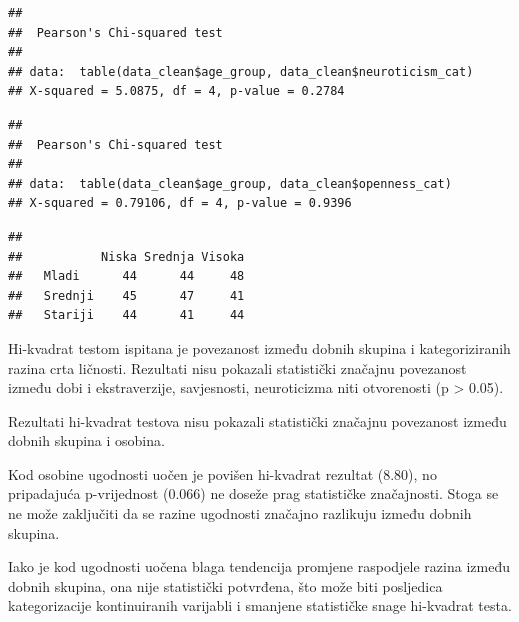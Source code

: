 \documentclass[
]{article}
\newenvironment{Shaded}{\begin{snugshade}}{\end{snugshade}}
\newcommand{\FunctionTok}[1]{\textcolor[rgb]{0.13,0.29,0.53}{\textbf{#1}}}
\newcommand{\NormalTok}[1]{#1}
\newcommand{\SpecialCharTok}[1]{\textcolor[rgb]{0.81,0.36,0.00}{\textbf{#1}}}
\begin{document}
\begin{verbatim}
## 
##  Pearson's Chi-squared test
## 
## data:  table(data_clean$age_group, data_clean$neuroticism_cat)
## X-squared = 5.0875, df = 4, p-value = 0.2784
\end{verbatim}

\begin{Shaded}
\end{Shaded}

\begin{verbatim}
## 
##  Pearson's Chi-squared test
## 
## data:  table(data_clean$age_group, data_clean$openness_cat)
## X-squared = 0.79106, df = 4, p-value = 0.9396
\end{verbatim}

\begin{Shaded}
\end{Shaded}

\begin{verbatim}
##          
##           Niska Srednja Visoka
##   Mladi      44      44     48
##   Srednji    45      47     41
##   Stariji    44      41     44
\end{verbatim}

Hi-kvadrat testom ispitana je povezanost između dobnih skupina i
kategoriziranih razina crta ličnosti. Rezultati nisu pokazali
statistički značajnu povezanost između dobi i ekstraverzije,
savjesnosti, neuroticizma niti otvorenosti (p \textgreater{} 0.05).

Rezultati hi-kvadrat testova nisu pokazali statistički značajnu
povezanost između dobnih skupina i osobina.

Kod osobine ugodnosti uočen je povišen hi-kvadrat rezultat (8.80), no
pripadajuća p-vrijednost (0.066) ne doseže prag statističke značajnosti.
Stoga se ne može zaključiti da se razine ugodnosti značajno razlikuju
između dobnih skupina.

Iako je kod ugodnosti uočena blaga tendencija promjene raspodjele razina
između dobnih skupina, ona nije statistički potvrđena, što može biti
posljedica kategorizacije kontinuiranih varijabli i smanjene statističke
snage hi-kvadrat testa.
\end{document}
